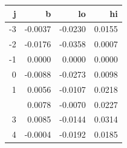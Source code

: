 
\begin{tabular}{rrrr}
\toprule
j & b & lo & hi\\
\midrule
-3 & -0.0037 & -0.0230 & 0.0155\\
-2 & -0.0176 & -0.0358 & 0.0007\\
-1 & 0.0000 & 0.0000 & 0.0000\\
0 & -0.0088 & -0.0273 & 0.0098\\
1 & 0.0056 & -0.0107 & 0.0218\\
\addlinespace
2 & 0.0078 & -0.0070 & 0.0227\\
3 & 0.0085 & -0.0144 & 0.0314\\
4 & -0.0004 & -0.0192 & 0.0185\\
\bottomrule
\end{tabular}
